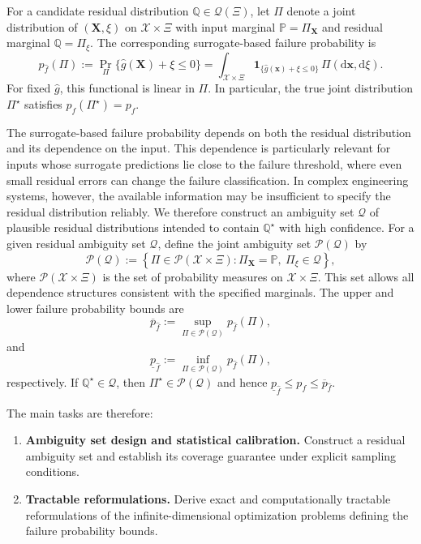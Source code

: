 \documentclass[review,11pt,3p,authoryear,nopreprintline]{elsarticle}
\begin{document}
For a candidate residual distribution $\mathbb Q\in\mathcal Q(\Xi)$, let $\Pi$ denote a joint distribution of $(\bm X,\xi)$ on $\mathcal X\times\Xi$ with input marginal $\mathbb P = \Pi_{\bm X}$ and residual marginal $\mathbb Q = \Pi_{\xi}$. The corresponding surrogate-based failure probability is
\begin{equation}
  p_{\hat f}(\Pi):=\Pr_\Pi\{\hat g(\bm X)+\xi\le0\}=\int_{\mathcal X\times\Xi}\mathbf 1_{\{\hat g(\bm x)+\xi\le0\}}\,\Pi(\mathrm d\bm x,\mathrm d\xi).
  \label{eq-surrogate-failure-probability}
\end{equation}
For fixed $\hat g$, this functional is linear in $\Pi$. In particular, the true joint distribution $\Pi^\star$ satisfies $p_{\hat f}(\Pi^\star)=p_f$.

The surrogate-based failure probability depends on both the residual distribution and its dependence on the input. This dependence is particularly relevant for inputs whose surrogate predictions lie close to the failure threshold, where even small residual errors can change the failure classification. In complex engineering systems, however, the available information may be insufficient to specify the residual distribution reliably. We therefore construct an ambiguity set $\mathscr Q$ of plausible residual distributions intended to contain $\mathbb Q^\star$ with high confidence. For a given residual ambiguity set $\mathscr Q$, define the joint ambiguity set $\mathscr P(\mathscr Q)$ by
\[
  \mathscr P(\mathscr Q) :=\left\{\Pi\in\mathcal P(\mathcal X\times\Xi):\Pi_{\bm X}=\mathbb P,\ \Pi_\xi\in\mathscr Q\right\},
\]
where $\mathcal P(\mathcal X\times\Xi)$ is the set of probability measures on $\mathcal X\times\Xi$. This set allows all dependence structures consistent with the specified marginals. The upper and lower failure probability bounds are
\begin{equation}
  \overline p_{\hat f}:=\sup_{\Pi\in\mathscr P(\mathscr Q)}p_{\hat f}(\Pi),
  \label{eq-upper-bound}
\end{equation}
and
\begin{equation}
  \underline p_{\hat f}:=\inf_{\Pi\in\mathscr P(\mathscr Q)}p_{\hat f}(\Pi),
  \label{eq-lower-bound}
\end{equation}
respectively. If $\mathbb Q^\star\in\mathscr Q$, then $\Pi^\star\in\mathscr P(\mathscr Q)$ and hence $\underline p_{\hat f}\le p_f\le\overline p_{\hat f}$.

The main tasks are therefore:
\begin{enumerate}
  \item \textbf{Ambiguity set design and statistical calibration.} Construct a residual ambiguity set and establish its coverage guarantee under explicit sampling conditions.
  \item \textbf{Tractable reformulations.} Derive exact and computationally tractable reformulations of the infinite-dimensional optimization problems defining the failure probability bounds.
\end{enumerate}
\end{document}
